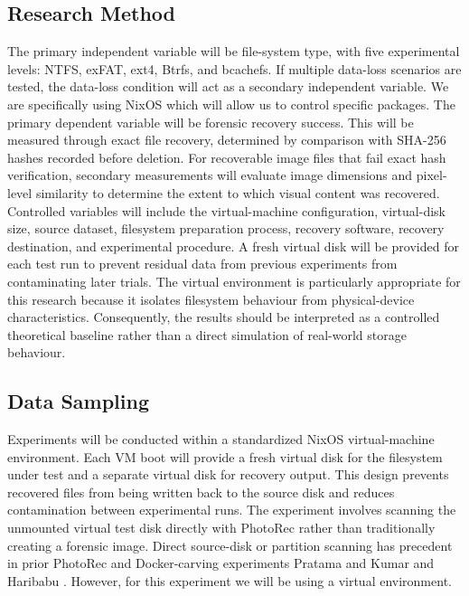 \documentclass[conference]{IEEEtran}
\begin{document}
\subsection{Research Method}

The primary independent variable will be file-system type, with five experimental levels: NTFS, exFAT, ext4, Btrfs, and bcachefs. If multiple data-loss scenarios are tested, the data-loss condition will act as a secondary independent variable.
We are specifically using NixOS which will allow us to control specific packages.
The primary dependent variable will be forensic recovery success. This will be measured through exact file recovery, determined by comparison with SHA-256 hashes recorded before deletion. For recoverable image files that fail exact hash verification, secondary measurements will evaluate image dimensions and pixel-level similarity to determine the extent to which visual content was recovered.
Controlled variables will include the virtual-machine configuration, virtual-disk size, source dataset, filesystem preparation process, recovery software, recovery destination, and experimental procedure. A fresh virtual disk will be provided for each test run to prevent residual data from previous experiments from contaminating later trials.
The virtual environment is particularly appropriate for this research because it isolates filesystem behaviour from physical-device characteristics. Consequently, the results should be interpreted as a controlled theoretical baseline rather than a direct simulation of real-world storage behaviour.

\subsection {Data Sampling}

Experiments will be conducted within a standardized NixOS virtual-machine environment. Each VM boot will provide a fresh virtual disk for the filesystem under test and a separate virtual disk for recovery output. This design prevents recovered files from being written back to the source disk and reduces contamination between experimental runs. The experiment involves scanning the unmounted virtual test disk directly with PhotoRec rather than traditionally creating a forensic image. Direct source-disk or partition scanning has precedent in prior PhotoRec and Docker-carving experiments Pratama \cite{pratama2021photorec} and Kumar and Haribabu \cite{kumar2022docker}. However, for this experiment we will be using a virtual environment.
\end{document}
